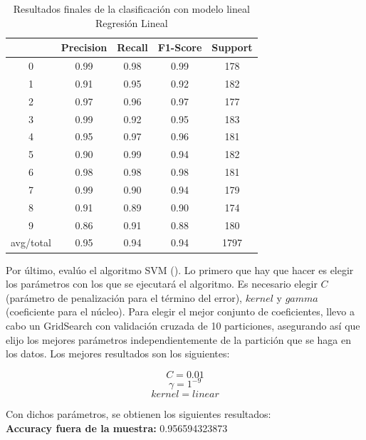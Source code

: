 \begin{table}[H]
	\centering
	\begin{tabular}{|c|c|c|c|c|}
		\hline
		& Precision & Recall & F1-Score & Support \\ \hline
		0         & 0.99      & 0.98   & 0.99     & 178     \\ \hline
		1         & 0.91      & 0.95   & 0.92     & 182     \\ \hline
		2         & 0.97      & 0.96   & 0.97     & 177     \\ \hline
		3         & 0.99      & 0.92   & 0.95     & 183     \\ \hline
		4         & 0.95      & 0.97   & 0.96     & 181     \\ \hline
		5         & 0.90      & 0.99   & 0.94     & 182     \\ \hline
		6         & 0.98      & 0.98   & 0.98     & 181     \\ \hline
		7         & 0.99      & 0.90   & 0.94     & 179     \\ \hline
		8         & 0.91      & 0.89   & 0.90     & 174     \\ \hline
		9         & 0.86      & 0.91   & 0.88     & 180     \\ \hline
		avg/total & 0.95      & 0.94   & 0.94     & 1797    \\ \hline
	\end{tabular}
	\caption{Resultados finales de la clasificación con modelo lineal Regresión Lineal}
\end{table}

\newpage

Por último, evalúo el algoritmo SVM (\cite{svc}). Lo primero que hay que hacer es elegir los parámetros con los que se ejecutará el algoritmo. Es necesario elegir $C$ (parámetro de penalización para el término del error), $kernel$ y $gamma$ (coeficiente para el núcleo). Para elegir el mejor conjunto de coeficientes, llevo a cabo un GridSearch con validación cruzada de 10 particiones, asegurando así que elijo los mejores parámetros independientemente de la partición que se haga en los datos. Los mejores resultados son los siguientes:

$$ C = 0.01$$
$$ \gamma = 1^{-9} $$
$$ kernel = linear $$

Con dichos parámetros, se obtienen los siguientes resultados: \\

\textbf{Accuracy fuera de la muestra:} 0.956594323873 \\


